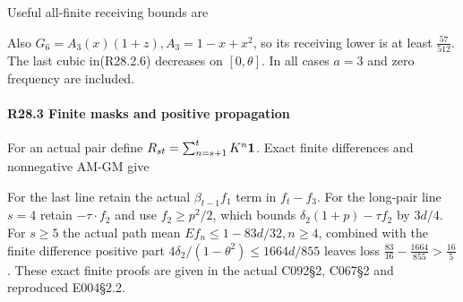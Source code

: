 

Useful all-finite receiving bounds are


Also \(G_{6}=A_{3}(x)(1+z),\allowbreak \allowbreak  A_{3}=1-x+x^2\), so its receiving lower is at least \(\frac{57}{512}\). The last cubic in(R28.2.6) decreases on \([0,\allowbreak \allowbreak \theta]\). In all cases \(a=3\) and zero frequency are included.

\paragraph{R28.3 Finite masks and positive propagation}

For an actual pair define \(R_{st}=\sum_{n=s+1}^{t}K^n\mathbf1\). Exact finite differences and nonnegative AM-GM give



For the last line retain the actual \(\beta_{t-1}f_{1}\) term in \(f_t-f_{3}\). For the long-pair line \(s=4\) retain \(-\tau\cdot f_{2}\) and use \(f_{2}\ge p^2/2\), which bounds \(\delta_2(1+p)-\tau f_{2}\) by \(3d/4\). For \(s\ge 5\) the actual path mean \(E f_n\le 1-83d/32,\allowbreak \allowbreak n\ge 4\), combined with the finite difference positive part \(4\delta_2/(1-\theta^2)\le 1664d/855\) leaves loss \(\frac{83}{16}-\frac{1664}{855}>\frac{16}{5}\). These exact finite proofs are given in the actual C092§2, C067§2 and reproduced E004§2.2.

